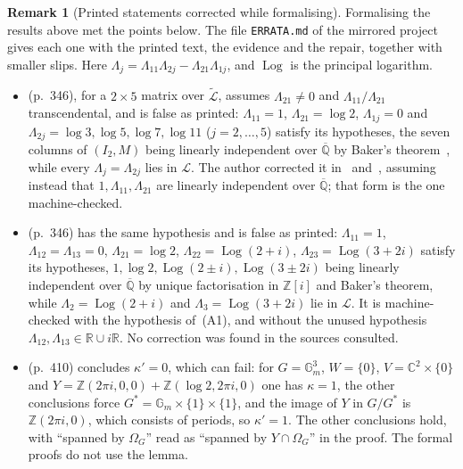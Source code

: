 \documentclass[11pt,a4paper]{article}
\theoremstyle{plain}
\theoremstyle{definition}
\newtheorem{remark}[theorem]{Remark}
\newcommand{\C}{\mathbb{C}}
\newcommand{\R}{\mathbb{R}}
\newcommand{\Z}{\mathbb{Z}}
\newcommand{\Alg}{\overline{\mathbb{Q}}}
\newcommand{\Logs}{\mathcal{L}}
\newcommand{\aLogs}{\widetilde{\mathcal{L}}}
\begin{document}
\begin{remark}[Printed statements corrected while formalising]\label{rem:printed-corrections}
Formalising the results above met the points below. The file \texttt{ERRATA.md} of the mirrored project gives each
one with the printed text, the evidence and the repair, together with smaller slips. Here
$\Lambda_{j}=\Lambda_{11}\Lambda_{2j}-\Lambda_{21}\Lambda_{1j}$, and $\operatorname{Log}$ is the principal
logarithm.
\begin{itemize}
\item[(A1)] \cite[Corollary~2.12]{waldschmidt-2005a} (p.~346), for a $2\times5$ matrix over $\aLogs$, assumes
$\Lambda_{21}\neq0$ and $\Lambda_{11}/\Lambda_{21}$ transcendental, and is false as printed: $\Lambda_{11}=1$,
$\Lambda_{21}=\log2$, $\Lambda_{1j}=0$ and $\Lambda_{2j}=\log3,\log5,\log7,\log11$ ($j=2,\dots,5$) satisfy its
hypotheses, the seven columns of $(I_{2},M)$ being linearly independent over $\Alg$ by Baker's
theorem~\cite{baker-1966}, while every $\Lambda_{j}=\Lambda_{2j}$ lies in $\Logs$. The author corrected it
in~\cite[\S4]{waldschmidt-2005b} and~\cite[Corollary~6.3]{waldschmidt-role}, assuming instead that
$1,\Lambda_{11},\Lambda_{21}$ are linearly independent over $\Alg$; that form is the one machine-checked.
\item[(A2)] \cite[Corollary~2.13]{waldschmidt-2005a} (p.~346) has the same hypothesis and is false as printed:
$\Lambda_{11}=1$, $\Lambda_{12}=\Lambda_{13}=0$, $\Lambda_{21}=\log2$, $\Lambda_{22}=\operatorname{Log}(2+i)$,
$\Lambda_{23}=\operatorname{Log}(3+2i)$ satisfy its hypotheses, $1,\log2,\operatorname{Log}(2\pm i),
\operatorname{Log}(3\pm2i)$ being linearly independent over $\Alg$ by unique factorisation in $\Z[i]$ and Baker's
theorem, while $\Lambda_{2}=\operatorname{Log}(2+i)$ and $\Lambda_{3}=\operatorname{Log}(3+2i)$ lie in $\Logs$. It is
machine-checked with the hypothesis of~(A1), and without the unused hypothesis $\Lambda_{12},\Lambda_{13}\in\R\cup
i\R$. No correction was found in the sources consulted.
\item[(A3)] \cite[Lemma~11.24]{waldschmidt-book} (p.~410) concludes $\kappa'=0$, which can fail: for
$G=\mathbb{G}_{m}^{3}$, $W=\{0\}$, $V=\C^{2}\times\{0\}$ and $Y=\Z(2\pi i,0,0)+\Z(\log2,2\pi i,0)$ one has $\kappa=1$,
the other conclusions force $G^{*}=\mathbb{G}_{m}\times\{1\}\times\{1\}$, and the image of $Y$ in $G/G^{*}$ is
$\Z(2\pi i,0)$, which consists of periods, so $\kappa'=1$. The other conclusions hold, with ``spanned by
$\Omega_{G}$'' read as ``spanned by $Y\cap\Omega_{G}$'' in the proof. The formal proofs do not use the lemma.

\end{itemize}
\end{remark}
\end{document}
